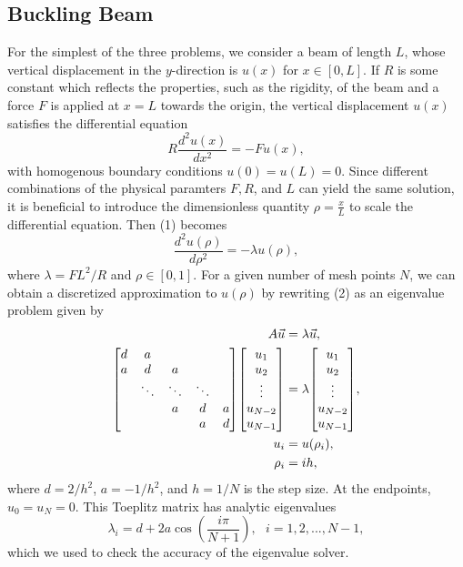\documentclass[prb,aps,twocolumn,showpacs,10pt]{revtex4-1}
\newenvironment{psmallmatrix}
  {\left[\begin{matrix}}
  {\end{matrix}\right]}
\begin{document}
\subsection{Buckling Beam}
For the simplest of the three problems, we consider a beam of length $L$, whose vertical displacement in the $y$-direction is $u(x)$ for $x \in [0,L]$. If $R$ is some constant which reflects the properties, such as the rigidity, of the beam and a force $F$ is applied at $x=L$ towards the origin, the vertical displacement $u(x)$ satisfies the differential equation
\begin{equation}
R\frac{d^2 u(x)}{dx^2} = -Fu(x),
\end{equation}
with homogenous boundary conditions $u(0)=u(L)=0$. Since different combinations of the physical paramters $F, R$, and $L$ can yield the same solution, it is beneficial to introduce the dimensionless quantity $\rho = \frac{x}{L}$ to scale the differential equation. Then (1) becomes
\begin{equation}
\frac{d^2 u(\rho)}{d\rho^2} = -\lambda u(\rho),
\end{equation}
where $\lambda = FL^2/R$ and $\rho \in [0,1]$. For a given number of mesh points $N$, we can obtain a discretized approximation to $u(\rho)$ by rewriting (2) as an eigenvalue problem given by
\begin{align}
\label{eqn:eqlabel}
\begin{split}
A\vec{u} &= \lambda \vec{u},
\\
\begin{psmallmatrix} d&a& \\
a&d&a\\
&\ddots&\ddots&\ddots\\
&&a&d&a\\
&&&a&d\\
\end{psmallmatrix}
\begin{psmallmatrix}
u_1\\u_2\\ \vdots \\ u_{N-2}\\ u_{N-1}
\end{psmallmatrix}&=
\lambda
\begin{psmallmatrix}
u_1\\u_2\\ \vdots \\ u_{N-2}\\ u_{N-1}
\end{psmallmatrix},\\
u_i &= u(\rho_i),\\
\rho_i &= ih,\\
\end{split}
\end{align}
where $d = 2/h^2$, $a = -1/h^2$, and $h = 1/N$ is the step size. At the endpoints, $u_0 = u_N = 0$. This Toeplitz matrix has analytic eigenvalues
\begin{equation}
\lambda_i = d+2a\cos \left( \frac{i \pi}{N+1} \right) , \ \ \ i = 1, 2, ..., N-1,
\end{equation}
which we used to check the accuracy of the eigenvalue solver.
\end{document}
